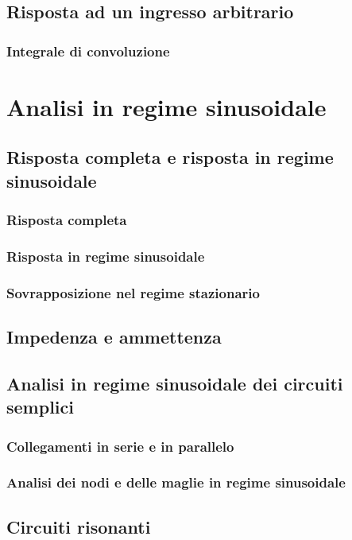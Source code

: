 \documentclass[a4paper,12pt]{article}
\theoremstyle{mystyle}
\begin{document}
\subsection{Risposta ad un ingresso arbitrario}
\subsubsection{Integrale di convoluzione}

\section{Analisi in regime sinusoidale}
\subsection{Risposta completa e risposta in regime sinusoidale}
\subsubsection{Risposta completa}
\subsubsection{Risposta in regime sinusoidale}
\subsubsection{Sovrapposizione nel regime stazionario}

\subsection{Impedenza e ammettenza}

\subsection{Analisi in regime sinusoidale dei circuiti semplici}
\subsubsection{Collegamenti in serie e in parallelo}
\subsubsection{Analisi dei nodi e delle maglie in regime sinusoidale}
\subsection{Circuiti risonanti}
\end{document}
